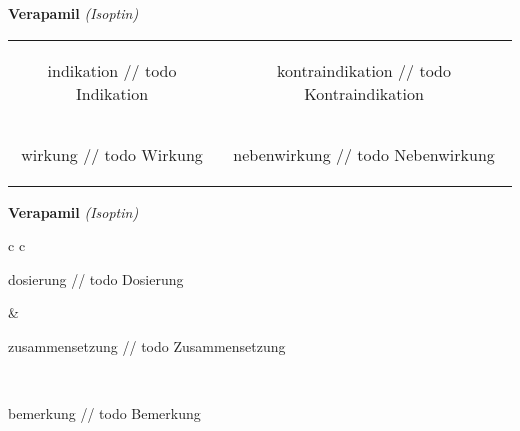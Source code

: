 \documentclass[12pt]{beamer}
\begin{document}
\begin{frame}{
    \textbf{Verapamil}
    \textit{(Isoptin)}
}
    \begin{tabular}{c c}
        \begin{beamercolorbox}[wd=\boxwidth\textwidth,ht=\boxheight\textheight,sep=1em]{indikation}
        // todo Indikation
        \end{beamercolorbox} & 
        \begin{beamercolorbox}[wd=\boxwidth\textwidth,ht=\boxheight\textheight,sep=1em]{kontraindikation}
        // todo Kontraindikation 
        \end{beamercolorbox} \\
        \begin{beamercolorbox}[wd=\boxwidth\textwidth,ht=\boxheight\textheight,sep=1em]{wirkung}
        // todo Wirkung
        \end{beamercolorbox} & 
        \begin{beamercolorbox}[wd=\boxwidth\textwidth,ht=\boxheight\textheight,sep=1em]{nebenwirkung}
        // todo Nebenwirkung
        \end{beamercolorbox} \\
    \end{tabular}
\end{frame}

\begin{frame}{
    \textbf{Verapamil}
    \textit{(Isoptin)}
}
    \begin{tabular}{c c}
        \begin{beamercolorbox}[wd=\boxwidth\textwidth,ht=\boxheight\textheight,sep=1em]{dosierung}
        // todo Dosierung
        \end{beamercolorbox} & 
        \begin{beamercolorbox}[wd=\boxwidth\textwidth,ht=\boxheight\textheight,sep=1em]{zusammensetzung}
        // todo Zusammensetzung
        \end{beamercolorbox} \\
        \begin{beamercolorbox}[wd=\textwidth,ht=\boxheight\textheight,sep=1em]{bemerkung}
        // todo Bemerkung
        \end{beamercolorbox} \\
    \end{tabular}
\end{frame}
\end{document}
